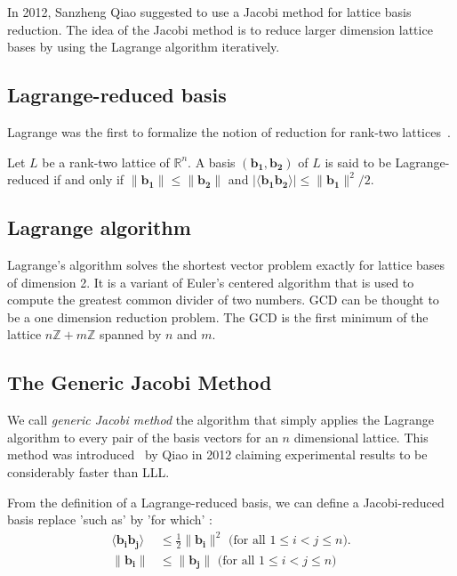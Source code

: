 \documentclass[10pt, a4paper]{article}
\newcommand{\my}[1]{{\color{blue} #1 }}
\renewcommand{\vec}[1]{\mathbf{#1}}
\begin{document}
In 2012, Sanzheng Qiao suggested to use a Jacobi method for lattice basis reduction\cite{originalJacobiMethodLatticeBasisReduction}. The idea of the Jacobi method is to reduce larger dimension lattice bases by using the Lagrange algorithm iteratively.

\subsection{Lagrange-reduced basis}

Lagrange was the first to formalize the notion of reduction for rank-two lattices~\cite{lagrangeArithmetique}.

Let $L$ be a rank-two lattice of $\mathbb{R}^n$. A basis $(\vec{b_1}, \vec{b_2})$ of $L$ is said to be Lagrange-reduced if and only if $\|\vec{b_1}\| \leq \|\vec{b_2}\|$ and $| \langle \vec{b_1} \vec{b_2} \rangle | \leq \| \vec{b_1} \|^2 / 2 $. 

\subsection{Lagrange algorithm}
\label{sec:lagrangeAlgorithm}

Lagrange's algorithm solves the shortest vector problem exactly for lattice bases of dimension 2. It is a variant of Euler's centered algorithm that is used to compute the greatest common divider of two numbers. GCD can be thought to be a one dimension reduction problem. The GCD is the first minimum of the lattice $n \mathbb{Z} + m \mathbb{Z}$ spanned by $n$ and $m$.


\subsection{The Generic Jacobi Method}
We call \emph{generic Jacobi method} the algorithm that simply applies the Lagrange algorithm to every pair of the basis vectors for an $n$ dimensional lattice. This method was introduced~\cite{originalJacobiMethodLatticeBasisReduction} by Qiao in 2012 claiming experimental results to be considerably faster than LLL.

From the definition of a Lagrange-reduced basis, we can define a Jacobi-reduced basis \my{replace 'such as' by 'for which'}:
\begin{align}
\langle \vec{b_i} \vec{b_j} \rangle &\leq \frac{1}{2} \| \vec{b_i}\|^2 \text{ (for all $1 \leq i < j \leq n$)}.\\
\| \vec{b_i}\| &\leq \|\vec{b_j} \| \text{ (for all $1 \leq i < j \leq n$)}
\end{align}
\end{document}
